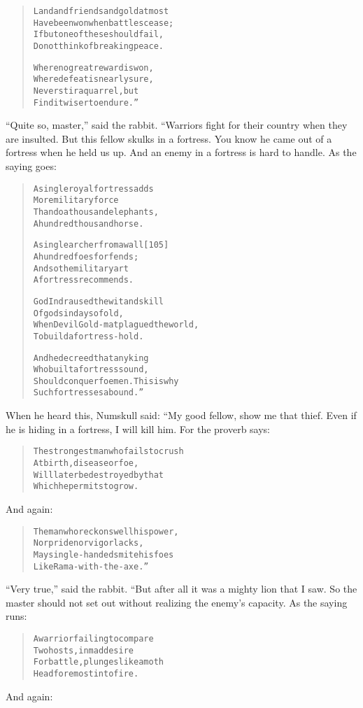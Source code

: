 \documentclass[article, twoside, 14pt]{memoir}
\renewenvironment{verbatim}{%
\begin{quote}%
\vskip -10pt%
\begin{alltt}\normalfont\large}{\end{alltt}%
\end{quote}%
\vskip -10pt
} %
\begin{document}
\begin{verbatim}
Land and friends and gold at most
    Have been won when battles cease;
If but one of these should fail,
    Do not think of breaking peace.

Where no great reward is won,
    Where defeat is nearly sure,
Never stir a quarrel, but
    Find it wiser to endure.”
\end{verbatim}
``Quite so, master,'' said the rabbit. “Warriors fight for their
country when they are insulted. But this fellow skulks in a
fortress. You know he came out of a fortress when he held us up.
And an enemy in a fortress is hard to handle. As the saying goes:

\begin{verbatim}
A single royal fortress adds
    More military force
Than do a thousand elephants,
    A hundred thousand horse.

A single archer from a wall                             [105]
    A hundred foes forfends;
And so the military art
    A fortress recommends.

God Indra used the wit and skill
    Of gods in days of old,
When Devil Gold-mat plagued the world,
    To build a fortress-hold.

And he decreed that any king
    Who built a fortress sound,
Should conquer foemen. This is why
    Such fortresses abound.”
\end{verbatim}
When he heard this, Numskull said: “My good fellow, show me that
thief. Even if he is hiding in a fortress, I will kill him. For the
proverb says:

\begin{verbatim}
The strongest man who fails to crush
    At birth, disease or foe,
Will later be destroyed by that
    Which he permits to grow.
\end{verbatim}
And again:

\begin{verbatim}
The man who reckons well his power,
    Nor pride nor vigor lacks,
May single-handed smite his foes
    Like Rama-with-the-axe.”
\end{verbatim}
``Very true,'' said the rabbit. “But after all it was a mighty lion
that I saw. So the master should not set out without realizing the
enemy's capacity. As the saying runs:

\begin{verbatim}
A warrior failing to compare
    Two hosts, in mad desire
For battle, plunges like a moth
    Headforemost into fire.
\end{verbatim}
And again:
\end{document}
